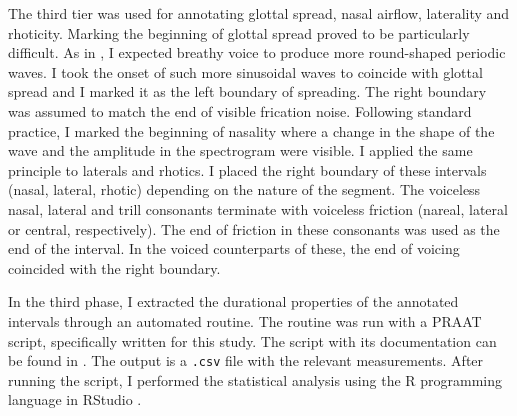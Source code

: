 The third tier was used for annotating glottal spread, nasal airflow, laterality and rhoticity.
Marking the beginning of glottal spread proved to be particularly difficult.
As in \citet{khan2012}, I expected breathy voice to produce more round-shaped periodic waves.
I took the onset of such more sinusoidal waves to coincide with glottal spread and I marked it as the left boundary of spreading.
The right boundary was assumed to match the end of visible frication noise.
Following standard practice, I marked the beginning of nasality where a change in the shape of the wave and the amplitude in the spectrogram were visible.
I applied the same principle to laterals and rhotics.
I placed the right boundary of these intervals (nasal, lateral, rhotic) depending on the nature of the segment.
The voiceless nasal, lateral and trill consonants terminate with voiceless friction (nareal, lateral or central, respectively).
The end of friction in these consonants was used as the end of the interval.
In the voiced counterparts of these, the end of voicing coincided with the right boundary.

In the third phase, I extracted the durational properties of the annotated intervals through an automated routine.
The routine was run with a PRAAT script, specifically written for this study.
The script with its documentation can be found in .
The output is a \texttt{.csv} file with the relevant measurements.
After running the script, I performed the statistical analysis using the R programming language \citep{r-core-team2015} in RStudio \citep{rstudio-team2015}.














